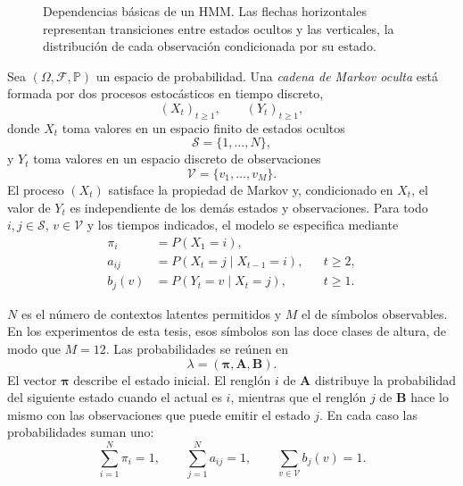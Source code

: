\begin{figure}[H]
\centering
{}
\caption{Dependencias básicas de un HMM. Las flechas horizontales representan transiciones entre estados ocultos y las verticales, la distribución de cada observación condicionada por su estado.}
\label{fig:hmm-esquema}
\end{figure}

\begin{Definicion}
Sea $(\Omega,\mathcal{F},\mathbb{P})$ un espacio de probabilidad. Una \emph{cadena de Markov oculta} está formada por dos procesos estocásticos en tiempo discreto,
\[
(X_t)_{t\geq 1}, \qquad (Y_t)_{t\geq 1},
\]
donde $X_t$ toma valores en un espacio finito de estados ocultos
\[
\mathcal{S}=\{1,\ldots,N\},
\]
y $Y_t$ toma valores en un espacio discreto de observaciones
\[
\mathcal{V}=\{v_1,\ldots,v_M\}.
\]
El proceso $(X_t)$ satisface la propiedad de Markov y, condicionado en $X_t$, el valor de $Y_t$ es independiente de los demás estados y observaciones. Para todo $i,j\in\mathcal{S}$, $v\in\mathcal{V}$ y los tiempos indicados, el modelo se especifica mediante
\[
\begin{aligned}
\pi_i&=P(X_1=i),\\
a_{ij}&=P(X_t=j\mid X_{t-1}=i), && t\geq 2,\\
b_j(v)&=P(Y_t=v\mid X_t=j), && t\geq 1.
\end{aligned}
\]
\end{Definicion}

$N$ es el número de contextos latentes permitidos y $M$ el de símbolos observables. En los experimentos de esta tesis, esos símbolos son las doce clases de altura, de modo que $M=12$. Las probabilidades se reúnen en
\[
\lambda=(\boldsymbol{\pi},\mathbf{A},\mathbf{B}).
\]
El vector $\boldsymbol{\pi}$ describe el estado inicial. El renglón $i$ de $\mathbf{A}$ distribuye la probabilidad del siguiente estado cuando el actual es $i$, mientras que el renglón $j$ de $\mathbf{B}$ hace lo mismo con las observaciones que puede emitir el estado $j$. En cada caso las probabilidades suman uno:
\[
\sum_{i=1}^{N}\pi_i=1,
\qquad
\sum_{j=1}^{N}a_{ij}=1,
\qquad
\sum_{v\in\mathcal{V}}b_j(v)=1.
\]


